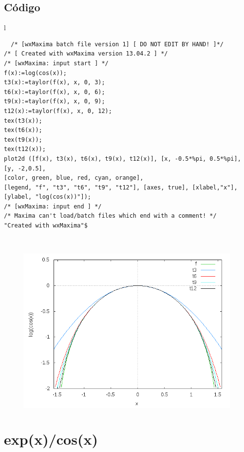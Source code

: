 \documentclass[10pt]{article}
\begin{document}
\subsection{Código}
\begin{tabular}{l}
\begin{verbatim}  
  /* [wxMaxima batch file version 1] [ DO NOT EDIT BY HAND! ]*/
/* [ Created with wxMaxima version 13.04.2 ] */
/* [wxMaxima: input start ] */
f(x):=log(cos(x));
t3(x):=taylor(f(x), x, 0, 3);
t6(x):=taylor(f(x), x, 0, 6);
t9(x):=taylor(f(x), x, 0, 9);
t12(x):=taylor(f(x), x, 0, 12);
tex(t3(x));
tex(t6(x));
tex(t9(x));
tex(t12(x));
plot2d ([f(x), t3(x), t6(x), t9(x), t12(x)], [x, -0.5*%pi, 0.5*%pi], [y, -2,0.5],
[color, green, blue, red, cyan, orange],
[legend, "f", "t3", "t6", "t9", "t12"], [axes, true], [xlabel,"x"], 
[ylabel, "log(cos(x))"]);
/* [wxMaxima: input end ] */
/* Maxima can't load/batch files which end with a comment! */
"Created with wxMaxima"$
\end{verbatim} \\
\begin{figure}
  \centering
    \includegraphics[scale=0.4]{logcos}
\end{figure}
\end{tabular}


\newpage


\section{exp(x)/cos(x)}
\end{document}
